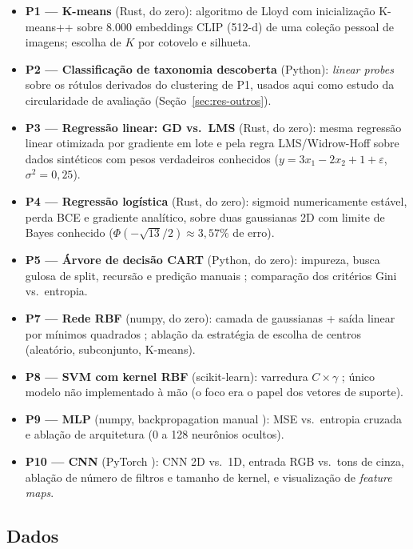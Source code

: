 \documentclass[12pt]{article}
\begin{document}
\begin{itemize}
  \item \textbf{P1 --- K-means} (Rust, do zero): algoritmo de Lloyd com
        inicialização K-means++ sobre 8.000 embeddings CLIP (512-d) de uma
        coleção pessoal de imagens; escolha de $K$ por cotovelo e silhueta.
  \item \textbf{P2 --- Classificação de taxonomia descoberta} (Python):
        \emph{linear probes} sobre os rótulos derivados do clustering de P1,
        usados aqui como estudo da circularidade de avaliação
        (Seção~\ref{sec:res-outros}).
  \item \textbf{P3 --- Regressão linear: GD vs.\ LMS} (Rust, do zero):
        mesma regressão linear otimizada por gradiente em lote e pela regra
        LMS/Widrow-Hoff \cite{widrow1960} sobre dados sintéticos com pesos
        verdadeiros conhecidos ($y = 3x_1 - 2x_2 + 1 + \varepsilon$,
        $\sigma^2 = 0{,}25$).
  \item \textbf{P4 --- Regressão logística} (Rust, do zero): sigmoid
        numericamente estável, perda BCE e gradiente analítico, sobre duas
        gaussianas 2D com limite de Bayes conhecido
        ($\Phi(-\sqrt{13}/2) \approx 3{,}57\%$ de erro).
  \item \textbf{P5 --- Árvore de decisão CART} (Python, do zero): impureza,
        busca gulosa de split, recursão e predição manuais \cite{breiman1984};
        comparação dos critérios Gini vs.\ entropia.
  \item \textbf{P7 --- Rede RBF} (numpy, do zero): camada de gaussianas +
        saída linear por mínimos quadrados \cite{broomhead1988}; ablação da
        estratégia de escolha de centros (aleatório, subconjunto, K-means).
  \item \textbf{P8 --- SVM com kernel RBF} (scikit-learn): varredura
        $C \times \gamma$ \cite{cortes1995}; único modelo não implementado à
        mão (o foco era o papel dos vetores de suporte).
  \item \textbf{P9 --- MLP} (numpy, backpropagation manual
        \cite{rumelhart1986}): MSE vs.\ entropia cruzada e ablação de
        arquitetura (0 a 128 neurônios ocultos).
  \item \textbf{P10 --- CNN} (PyTorch \cite{lecun1998}): CNN 2D vs.\ 1D,
        entrada RGB vs.\ tons de cinza, ablação de número de filtros e
        tamanho de kernel, e visualização de \emph{feature maps}.
\end{itemize}

\subsection{Dados}\label{sec:met-dados}
\end{document}
